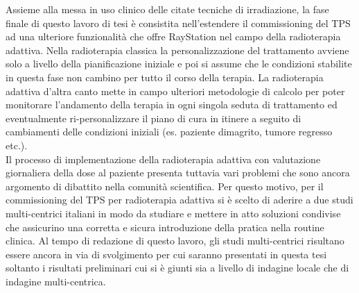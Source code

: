 Assieme alla messa in uso clinico delle citate tecniche di irradiazione, la fase finale di questo lavoro di tesi è consistita nell'estendere il commissioning del TPS ad una ulteriore funzionalità che offre RayStation nel campo della radioterapia adattiva. Nella radioterapia classica la personalizzazione del trattamento avviene solo a livello della pianificazione iniziale e poi si assume che le condizioni stabilite in questa fase non cambino per tutto il corso della terapia. La radioterapia adattiva d'altra canto mette in campo ulteriori metodologie di calcolo per poter monitorare l'andamento della terapia in ogni singola seduta di trattamento ed eventualmente ri-personalizzare il piano di cura in itinere a seguito di cambiamenti delle condizioni iniziali (es. paziente dimagrito, tumore regresso etc.).\\
Il processo di implementazione della radioterapia adattiva con valutazione giornaliera della dose al paziente presenta tuttavia vari problemi che sono ancora argomento di dibattito nella comunità scientifica. Per questo motivo, per il commissioning del TPS per radioterapia adattiva si è scelto di aderire a due studi multi-centrici italiani in modo da studiare e mettere in atto soluzioni condivise che assicurino una corretta e sicura introduzione della pratica nella routine clinica. Al tempo di redazione di questo lavoro, gli studi multi-centrici risultano essere ancora in via di svolgimento per cui saranno presentati in questa tesi soltanto i risultati preliminari cui si è giunti sia a livello di indagine locale che di indagine multi-centrica.





